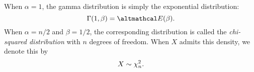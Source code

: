 \documentclass[../probability.tex]{subfiles}
\begin{document}
\begin{note}
    When \(\alpha = 1\), the gamma distribution is simply the exponential distribution:
    \[
        \Gamma(1, \beta) = \mcal{E}(\beta)\text.
    \]
    When \(\alpha = n/2\) and \(\beta = 1/2\), the corresponding distribution
    is called the \emph{chi-squared distribution} with \(n\) degrees of freedom.
    When \(X\) admits this density, we denote this by
    \[
        X \sim \chi_n^2\text.
    \]
\end{note}
\end{document}
